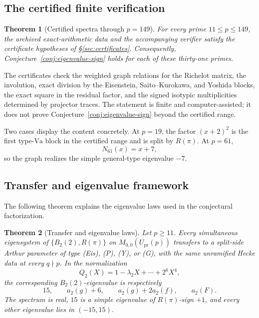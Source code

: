 \documentclass[11pt]{amsart}
\theoremstyle{plain}
\newtheorem{theorem}{Theorem}[section]
\theoremstyle{definition}
\newcommand{\Upr}{U_{\mathrm{pr}}}
\newcommand{\Va}{\mathrm{Va}}
\providecommand{\Upr}{U_{\mathrm{pr}}}
\providecommand{\Va}{\mathrm{Va}}
\begin{document}
	\subsection{The certified finite verification}
	
	\begin{theorem}[Certified spectra through $p=149$]
		\label{thm:certified-spectra}
		For every prime $11\le p\le149$, the archived exact-arithmetic data and the
		accompanying verifier satisfy the certificate hypotheses of \S\ref{sec:certificates}.
		Consequently, Conjecture~\ref{conj:eigenvalue-sign} holds for each of these thirty-one
		primes.
	\end{theorem}
	
	The certificates check the weighted graph relations for the Richelot
	matrix, the involution, exact division by the Eisenstein,
	Saito--Kurokawa, and Yoshida blocks, the exact square in the residual
	factor, and the signed isotypic multiplicities determined by projector
	traces. The statement is finite and computer-assisted; it does not prove
	Conjecture~\ref{conj:eigenvalue-sign} beyond the certified range.
	
	Two cases display the content concretely. At $p=19$, the factor
	$(x+2)^2$ is the first type-$\Va$ block in the certified range and is
	split by $R(\pi)$. At $p=61$,
	\[
	N_{61}(x)=x+7,
	\]
	so the graph realizes the simple general-type eigenvalue $-7$.
	
	\subsection{Transfer and eigenvalue framework}
	
	The following theorem explains the eigenvalue laws used in the
	conjectural factorization.
	
	\begin{theorem}[Transfer and eigenvalue laws]\label{thm:transfer-framework}
		Let $p\ge11$. Every simultaneous eigensystem of $\{B_2(2),R(\pi)\}$ on
		$M_{0,0}(\Upr(p))$ transfers to a split-side Arthur parameter of type
		\textup{(Eis)}, \textup{(P)}, \textup{(Y)}, or \textup{(G)}, with the
		same unramified Hecke data at every $q\nmid p$. In the normalization
		\[
		Q_2(X)=1-\lambda_2X+\cdots+2^6X^4,
		\]
		the corresponding $B_2(2)$-eigenvalue is respectively
		\[
		15,\qquad a_2(g)+6,\qquad a_2(g)+2a_2(f),\qquad a_2(F).
		\]
		The spectrum is real, $15$ is a simple eigenvalue of $R(\pi)$-sign $+1$,
		and every other eigenvalue lies in $(-15,15)$.
	\end{theorem}
	
\end{document}
